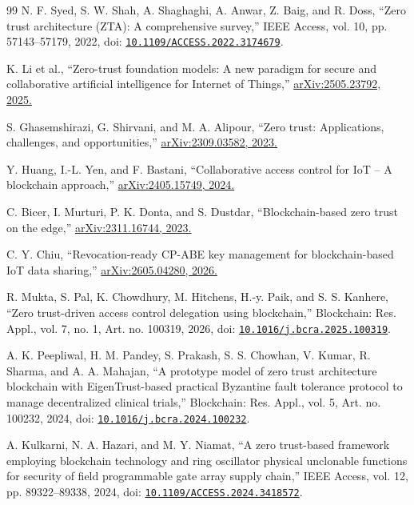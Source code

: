 \documentclass[a4paper,5p,times,twocolumn,number,sort&compress]{elsarticle}
\begin{document}
\begin{thebibliography}{99}
 N. F. Syed, S. W. Shah, A. Shaghaghi, A. Anwar, Z. Baig, and R. Doss, ``Zero trust architecture (ZTA): A comprehensive survey,'' IEEE Access, vol. 10, pp. 57143--57179, 2022, doi: \href{https://ieeexplore.ieee.org/document/9773102}{\nolinkurl{10.1109/ACCESS.2022.3174679}}.

 K. Li et al., ``Zero-trust foundation models: A new paradigm for secure and collaborative artificial intelligence for Internet of Things,'' \href{https://arxiv.org/abs/2505.23792}{arXiv:2505.23792, 2025.}

 S. Ghasemshirazi, G. Shirvani, and M. A. Alipour, ``Zero trust: Applications, challenges, and opportunities,'' \href{https://arxiv.org/abs/2309.03582}{arXiv:2309.03582, 2023.}

 Y. Huang, I.-L. Yen, and F. Bastani, ``Collaborative access control for IoT -- A blockchain approach,'' \href{https://arxiv.org/abs/2405.15749}{arXiv:2405.15749, 2024.}

 C. Bicer, I. Murturi, P. K. Donta, and S. Dustdar, ``Blockchain-based zero trust on the edge,'' \href{https://arxiv.org/abs/2311.16744}{arXiv:2311.16744, 2023.}

 C. Y. Chiu, ``Revocation-ready CP-ABE key management for blockchain-based IoT data sharing,'' \href{https://arxiv.org/abs/2605.04280}{arXiv:2605.04280, 2026.}

 R. Mukta, S. Pal, K. Chowdhury, M. Hitchens, H.-y. Paik, and S. S. Kanhere, ``Zero trust-driven access control delegation using blockchain,'' Blockchain: Res. Appl., vol. 7, no. 1, Art. no. 100319, 2026, doi: \href{https://doi.org/10.1016/j.bcra.2025.100319}{\nolinkurl{10.1016/j.bcra.2025.100319}}.

 A. K. Peepliwal, H. M. Pandey, S. Prakash, S. S. Chowhan, V. Kumar, R. Sharma, and A. A. Mahajan, ``A prototype model of zero trust architecture blockchain with EigenTrust-based practical Byzantine fault tolerance protocol to manage decentralized clinical trials,'' Blockchain: Res. Appl., vol. 5, Art. no. 100232, 2024, doi: \href{https://doi.org/10.1016/j.bcra.2024.100232}{\nolinkurl{10.1016/j.bcra.2024.100232}}.

 A. Kulkarni, N. A. Hazari, and M. Y. Niamat, ``A zero trust-based framework employing blockchain technology and ring oscillator physical unclonable functions for security of field programmable gate array supply chain,'' IEEE Access, vol. 12, pp. 89322--89338, 2024, doi: \href{https://doi.org/10.1109/ACCESS.2024.3418572}{\nolinkurl{10.1109/ACCESS.2024.3418572}}.


\end{thebibliography}
\end{document}
